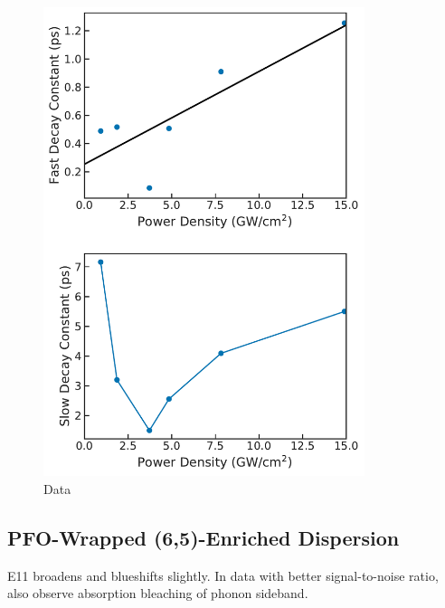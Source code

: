 \begin{figure}[ht]
	\centering
	\includegraphics[height=5.4in]{images/chapter_my_data/Weilu_CNT_Fast_Slow_Decay_Const}
	\caption{Data}
\end{figure}


\clearpage
\subsection{PFO-Wrapped (6,5)-Enriched Dispersion}

E11 broadens and blueshifts slightly. In data with better signal-to-noise ratio, also observe absorption bleaching of phonon sideband.

